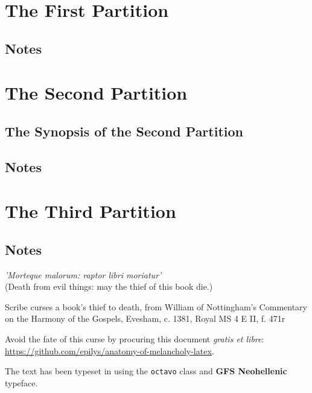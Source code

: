 \documentclass[titlepage,12pt,a4]{octavo}
\begin{document}
\part{The First Partition}







\chapter{Notes}
\part{The Second Partition}
\chapter{The Synopsis of the Second Partition}





\chapter{Notes}
\part{The Third Partition}









\chapter{Notes}
\backmatter
{}
\nocite{*}
\thispagestyle{empty}
\clearpage
\thispagestyle{empty}
\colophontitlesize{18pt}
\colophonparsize{10pt}
\begin{colophon}
\epigraph{\footnotesize\textit{'Morteque malorum: raptor libri moriatur'}\\(Death from evil things: may the thief of this book die.)}{\scriptsize{}Scribe curses a book’s thief to death, from William of Nottingham’s Commentary on the Harmony of the Gospels, Evesham, c. 1381, Royal MS 4 E II, f. 471r}
Avoid the fate of this curse by procuring this document \emph{gratis et libre}: \href{https://github.com/epilys/anatomy-of-melancholy-latex}{\underline{https://github.com/epilys/anatomy-of-melancholy-latex}}.

The text has been typeset in \XeLaTeX{} using the \texttt{octavo} class and \textbf{GFS Neohellenic} typeface.
\end{colophon}
\end{document}
